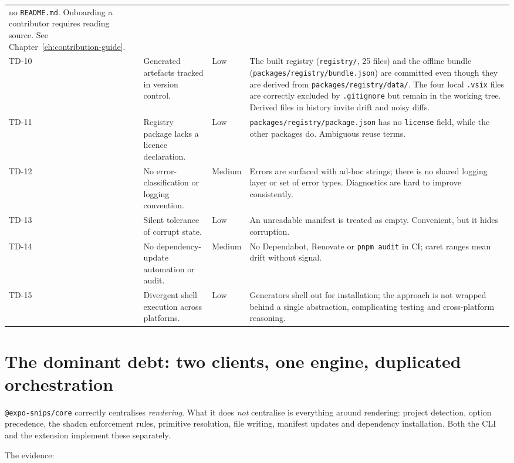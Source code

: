 \begin{longtable}{p{1.2cm}p{3.6cm}p{1.7cm}p{7.1cm}}
no \texttt{README.md}. Onboarding a contributor requires reading source. See
Chapter~\ref{ch:contribution-guide}. \\
TD-10 & Generated artefacts tracked in version control. & Low & The built
registry (\texttt{registry/}, 25 files) and the offline bundle
(\texttt{packages/registry/bundle.json}) are committed even though they are
derived from \texttt{packages/registry/data/}. The four local \texttt{.vsix}
files are correctly excluded by \texttt{.gitignore} but remain in the working
tree. Derived files in history invite drift and noisy diffs. \\
TD-11 & Registry package lacks a licence declaration. & Low &
\texttt{packages/registry/package.json} has no \texttt{license} field, while the
other packages do. Ambiguous reuse terms. \\
TD-12 & No error-classification or logging convention. & Medium & Errors are
surfaced with ad-hoc strings; there is no shared logging layer or set of error
types. Diagnostics are hard to improve consistently. \\
TD-13 & Silent tolerance of corrupt state. & Low & An unreadable manifest is
treated as empty. Convenient, but it hides corruption. \\
TD-14 & No dependency-update automation or audit. & Medium & No Dependabot,
Renovate or \texttt{pnpm audit} in CI; caret ranges mean drift without signal. \\
TD-15 & Divergent shell execution across platforms. & Low & Generators shell out
for installation; the approach is not wrapped behind a single abstraction,
complicating testing and cross-platform reasoning. \\
\bottomrule
\end{longtable}

\section{The dominant debt: two clients, one engine, duplicated orchestration}

\texttt{@expo-snips/core} correctly centralises \emph{rendering}. What it does
\emph{not} centralise is everything around rendering: project detection, option
precedence, the shadcn enforcement rules, primitive resolution, file writing,
manifest updates and dependency installation. Both the CLI and the extension
implement these separately.

The evidence:

